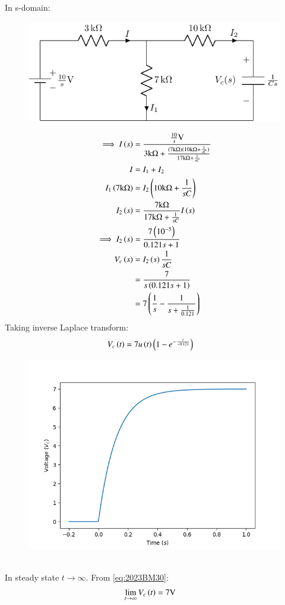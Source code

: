 \documentclass[journal,12pt,twocolumn]{IEEEtran}
\theoremstyle{remark}
\begin{document}
In s-domain:
\begin{figure}[h!]
    \centering
    \includegraphics[width=\columnwidth]{figs/c_fig2.pdf}
\end{figure}
\begin{align}
\implies I\left(s\right) &= \frac{\frac{10}{s}\text{V}}{3\text{k}\ohm + \frac{(7\text{k}\ohm)(10\text{k}\ohm + \frac{1}{sC})}{17\text{k}\ohm + \frac{1}{sC}}} \\
I &= I_1 + I_2 \\
I_1\left(7\text{k}\ohm\right) &= I_2\left(10\text{k}\ohm + \frac{1}{sC}\right) \\
I_2\left(s\right) &= \frac{7\text{k}\ohm}{17\text{k}\ohm + \frac{1}{sC}}I\left(s\right) \\
\implies I_2\left(s\right) &= \frac{7\left(10^{-5}\right)}{0.121s + 1} \\
V_c\left(s\right) &= I_2\left(s\right)\frac{1}{sC} \\
&= \frac{7}{s\left(0.121s + 1\right)} \\
&= 7\left(\frac{1}{s} - \frac{1}{s + \frac{1}{0.121}}\right)
\end{align}
Taking inverse Laplace transform:
\begin{align}
V_c\left(t\right) &= 7u\left(t\right)\left(1 - e^{-\frac{t}{-0.121}}\right) \label{eq:2023BM30}
\end{align}
\begin{figure}[h!]
\centering
\includegraphics[width=\columnwidth]{figs/plot.png}
\label{fig:2023BM30}
\end{figure}
\\
In steady state $t \to \infty$. From \eqref{eq:2023BM30}:
\begin{align}
\lim_{t\to\infty}V_c\left(t\right) &= 7\text{V}
\end{align}
\end{document}
